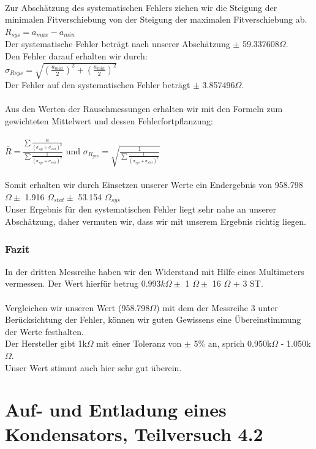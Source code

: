 \documentclass[12pt,a4paper]{article}
\begin{document}
\\Zur Abschätzung des systematischen Fehlers ziehen wir die Steigung der minimalen Fitverschiebung von der Steigung der maximalen Fitverschiebung ab.\\  
$R_{sys} = a_{max} - a_{min}$\\
Der systematische Fehler beträgt nach unserer Abschätzung $\pm$ 59.337608$\Omega$.\\ 
Den Fehler darauf erhalten wir durch:\\
$\sigma_{R sys} = \sqrt{(\frac{a_{max}}{2})^2+(\frac{a_{min}}{2})^2}$\\
Der Fehler auf den systematischen Fehler beträgt $\pm$ 3.857496$\Omega$.\\
\\Aus den Werten der Rauschmessungen erhalten wir mit den Formeln zum gewichteten Mittelwert und dessen Fehlerfortpflanzung:\\
\\$\bar{R} = \frac{\sum{\frac{R}{(\sigma_{sys}+\sigma_{stat})^2}}}{\sum{\frac{1}{(\sigma_{sys}+\sigma_{stat})^2}}}$ und $\sigma_{R_{ges}} = \sqrt{\frac{1}{\sum{\frac{1}{(\sigma_{sys}+\sigma_{stat})^2}}}}$\\
\\Somit erhalten wir durch Einsetzen unserer Werte ein Endergebnis von 958.798$\Omega \pm$ 1.916 $\Omega_{stat} \pm$ 53.154 $\Omega_{sys}$\\
Unser Ergebnis für den systematischen Fehler liegt sehr nahe an unserer Abschätzung, daher vermuten wir, dass wir mit unserem Ergebnis richtig liegen.\\ 
\subsubsection{Fazit}
In der dritten Messreihe haben wir den Widerstand mit Hilfe eines Multimeters vermessen. Der Wert hierfür betrug $0.993 k\Omega \pm$ 1 $\Omega \pm$ 16 $\Omega$ + 3 ST. \\ 
\\Vergleichen wir unseren Wert (958.798$\Omega$) mit dem der Messreihe 3 unter Berücksichtung der Fehler, können wir guten Gewissens eine Übereinstimmung der Werte festhalten. 
\\Der Hersteller gibt 1k$\Omega$ mit einer Toleranz von $\pm$ 5\% an, sprich 0.950k$\Omega$ - 1.050k$\Omega$. 
\\Unser Wert stimmt auch hier sehr gut überein.  
\section{Auf- und Entladung eines Kondensators, Teilversuch 4.2}
\end{document}
